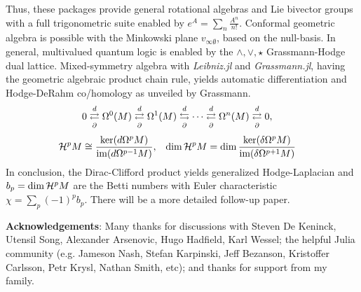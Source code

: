 \documentclass{juliacon}
\begin{document}
Thus, these packages provide general rotational algebras and Lie bivector groups with a full trigonometric suite enabled by $ e^{A} = \sum_n \frac{A^n}{n!} $.
Conformal geometric algebra is possible with the Minkowski plane $v_{\infty\emptyset}$, based on the null-basis.
In general, multivalued quantum logic is enabled by the $\wedge,\vee,\star$ Grassmann-Hodge dual lattice.
Mixed-symmetry algebra with \textit{Leibniz.jl} and \textit{Grassmann.jl}, having the geometric algebraic product chain rule, yields automatic differentiation and Hodge-DeRahm co/homology  as unveiled by Grassmann.
\begin{align*}
	0 &\overset{d}{\underset{\partial}{\rightleftarrows}} \Omega^0(M) \overset{d}{\underset{\partial}{\rightleftarrows}} \Omega^1(M) \overset{d}{\underset{\partial}{\leftrightarrows}} \cdots \overset{d}{\underset{\partial}{\rightleftarrows}} \Omega^n(M) \overset{d}{\underset{\partial}{\rightleftarrows}} 0,
\end{align*}
\begin{align*}
	\mathcal{H}^pM &\cong \frac{\ker(d\Omega^pM)}{\text{im}(d\Omega^{p-1}M)}, & \dim\mathcal{H}^pM &= \dim\frac{\ker(\delta\Omega^pM)}{\text{im}(\delta\Omega^{p+1}M)}
\end{align*}
In conclusion, the Dirac-Clifford product yields generalized Hodge-Laplacian and $b_p=\dim\mathcal{H}^pM$ are the Betti numbers with Euler characteristic $\chi = \sum_p (-1)^pb_p$.
There will be a more detailed follow-up paper.

\textbf{Acknowledgements}: Many thanks for discussions with Steven De Keninck, Utensil Song, Alexander Arsenovic, Hugo Hadfield, Karl Wessel; the helpful Julia community (e.g. Jameson Nash, Stefan Karpinski, Jeff Bezanson, Kristoffer Carlsson, Petr Krysl, Nathan Smith, etc); and thanks for support from my family.



\end{document}
